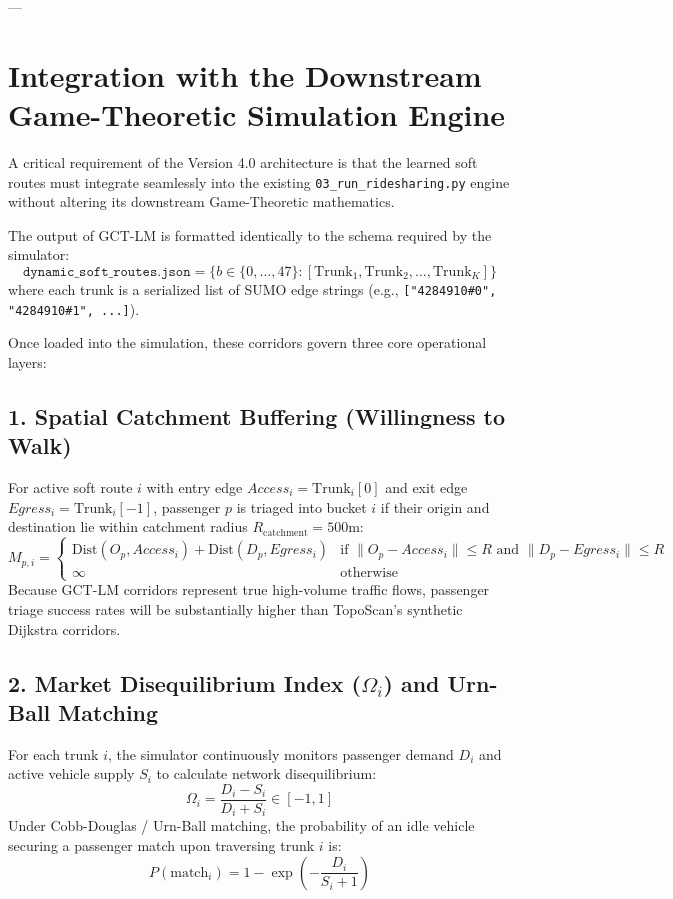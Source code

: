 \documentclass[12pt,a4paper]{article}
\begin{document}
---

\section{Integration with the Downstream Game-Theoretic Simulation Engine}

A critical requirement of the Version 4.0 architecture is that the learned soft routes must integrate seamlessly into the existing \texttt{03\_run\_ridesharing.py} engine without altering its downstream Game-Theoretic mathematics.

The output of GCT-LM is formatted identically to the schema required by the simulator:
\begin{equation}
\texttt{dynamic\_soft\_routes.json} = \{ b \in \{0, \dots, 47\} : [\text{Trunk}_1, \text{Trunk}_2, \dots, \text{Trunk}_K] \}
\end{equation}
where each trunk is a serialized list of SUMO edge strings (e.g., \texttt{["4284910\#0", "4284910\#1", ...]}).

Once loaded into the simulation, these corridors govern three core operational layers:

\subsection{1. Spatial Catchment Buffering (Willingness to Walk)}
For active soft route $i$ with entry edge $Access_i = \text{Trunk}_i[0]$ and exit edge $Egress_i = \text{Trunk}_i[-1]$, passenger $p$ is triaged into bucket $i$ if their origin and destination lie within catchment radius $R_{\text{catchment}} = 500\text{m}$:
\begin{equation}
M_{p, i} = \begin{cases}
\text{Dist}(O_p, Access_i) + \text{Dist}(D_p, Egress_i) & \text{if } \|O_p - Access_i\| \le R \text{ and } \|D_p - Egress_i\| \le R \\
\infty & \text{otherwise}
\end{cases}
\end{equation}
Because GCT-LM corridors represent true high-volume traffic flows, passenger triage success rates will be substantially higher than TopoScan's synthetic Dijkstra corridors.

\subsection{2. Market Disequilibrium Index ($\Omega_i$) and Urn-Ball Matching}
For each trunk $i$, the simulator continuously monitors passenger demand $D_i$ and active vehicle supply $S_i$ to calculate network disequilibrium:
\begin{equation}
\Omega_i = \frac{D_i - S_i}{D_i + S_i} \in [-1, 1]
\end{equation}
Under Cobb-Douglas / Urn-Ball matching, the probability of an idle vehicle securing a passenger match upon traversing trunk $i$ is:
\begin{equation}
P(\text{match}_i) = 1 - \exp\left( - \frac{D_i}{S_i + 1} \right)
\end{equation}
\end{document}
